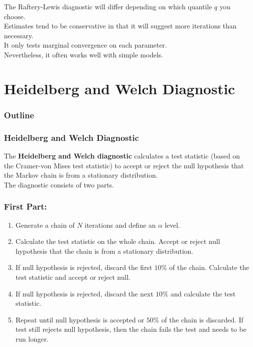 \documentclass[handout]{beamer}
\begin{document}
\begin{frame}
The Raftery-Lewis diagnostic will differ depending on which quantile
$q$ you choose. \\
\pause
\bigskip
Estimates tend to be conservative in that it will suggest more
iterations than necessary. \\
\pause
\bigskip
It only tests marginal convergence on each parameter. \\
\pause
\bigskip
Nevertheless, it often works well with simple models.
\end{frame}

\section{Heidelberg and Welch Diagnostic}

\begin{frame}
\frametitle{Outline}
\tableofcontents[currentsection]
\end{frame}

\begin{frame}
\frametitle{Heidelberg and Welch Diagnostic}
\pause
The \textbf{Heidelberg and Welch diagnostic} calculates a test statistic
(based on the Cramer-von Mises test statistic) to accept or reject the
null hypothesis that the Markov chain is from a stationary distribution.\\
\pause
\bigskip
The diagnostic consists of two parts.
\end{frame}

\begin{frame}
\frametitle{First Part:}
\pause
\begin{enumerate}
\item Generate a chain of $N$ iterations and define an $\alpha$ level.
\pause
\item Calculate the test statistic on the whole chain.  Accept or
reject null hypothesis that the chain is from a stationary distribution.
\pause
\item If null hypothesis is rejected, discard the first $10\%$ of the
chain.  Calculate the test statistic and accept or reject null.
\pause
\item If null hypothesis is rejected, discard the next $10\%$ and
calculate the test statistic.  
\pause
\item Repeat until null hypothesis is accepted or $50\%$ of the chain
is discarded.  If test still rejects null hypothesis, then the chain
fails the test and needs to be run longer.
\end{enumerate}
\end{frame}
\end{document}

